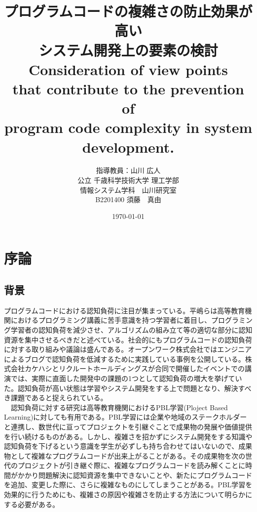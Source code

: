 \documentclass[11pt, a4paper]{jreport}
\begin{document}
    \title{プログラムコードの複雑さの防止効果が高い\\システム開発上の要素の検討\\Consideration of view points\\that contribute to the prevention of\\program code complexity in system development.}
    \author{指導教員：山川 広人\\
    公立 千歳科学技術大学 理工学部\\
    情報システム学科　山川研究室\\
B2201400 須藤　真由}
\date{\today}

\maketitle
{}
\tableofcontents
\chapter{序論}

\section{背景}
プログラムコードにおける認知負荷に注目が集まっている。平嶋ら\cite{haikei}は高等教育機関におけるプログラミング講義に苦手意識を持つ学習者に着目し、プログラミング学習者の認知負荷を減少させ、アルゴリズムの組み立て等の適切な部分に認知資源を集中させるべきだと述べている。社会的にもプログラムコードの認知負荷に対する取り組みや議論は盛んである。オープンワーク株式会社ではエンジニアによるブログで認知負荷を低減するために実践している事例を公開している。株式会社カケハシとリクルートホールディングスが合同で開催したイベントでの講演では、実際に直面した開発中の課題の1つとして認知負荷の増大を挙げていた。認知負荷が高い状態は学習やシステム開発をする上で問題となり、解決すべき課題であると捉えられている。\\　認知負荷に対する研究は高等教育機関におけるPBL学習(Ploject Based Learning)に対しても有用である。PBL学習には企業や地域のステークホルダーと連携し、数世代に亘ってプロジェクトを引継ぐことで成果物の発展や価値提供を行い続けるものがある。しかし、複雑さを招かずにシステム開発をする知識や認知負荷を下げるという意識を学生が必ずしも持ち合わせてはいないので、成果物として複雑なプログラムコードが出来上がることがある。その成果物を次の世代のプロジェクトが引き継ぐ際に、複雑なプログラムコードを読み解くことに時間がかかり問題解決に認知資源を集中できないことや、新たにプログラムコードを追加、変更した際に、さらに複雑なものにしてしまうことがある。PBL学習を効果的に行うためにも、複雑さの原因や複雑さを防止する方法について明らかにする必要がある。
\end{document}
